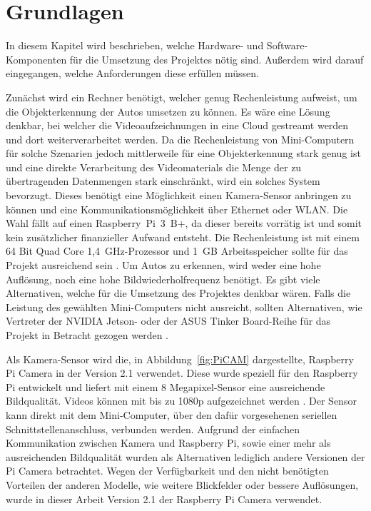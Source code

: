 \section{Grundlagen}\label{ch:Grundlagen}
In diesem Kapitel wird beschrieben, welche Hardware- und Software-Komponenten für die Umsetzung des Projektes nötig sind.
Außerdem wird darauf eingegangen, welche Anforderungen diese erfüllen müssen.

Zunächst wird ein Rechner benötigt, welcher genug Rechenleistung aufweist, um die Objekt\-erkennung der Autos umsetzen zu können.
Es wäre eine Lösung denkbar, bei welcher die Videoaufzeichnungen in eine Cloud gestreamt werden und dort weiterverarbeitet werden.
Da die Rechenleistung von Mini-Computern für solche Szenarien jedoch mittlerweile für eine Objekterkennung stark genug ist und eine direkte Verarbeitung des Videomaterials die Menge der zu übertragenden Datenmengen stark einschränkt, wird ein solches System bevorzugt.
Dieses benötigt eine Möglichkeit einen Kamera-Sensor anbringen zu können und eine Kommunikationsmöglichkeit über Ethernet oder WLAN.
Die Wahl fällt auf einen Raspberry~Pi~3~B+, da dieser bereits vorrätig ist und somit kein zusätzlicher finanzieller Aufwand entsteht.
Die Rechenleistung ist mit einem 64 Bit Quad Core 1,4~GHz-Prozessor und 1~GB Arbeitsspeicher sollte für das Projekt ausreichend sein \cite{pi3}.
Um Autos zu erkennen, wird weder eine hohe Auflösung, noch eine hohe Bildwiederholfrequenz benötigt.
Es gibt viele Alternativen, welche für die Umsetzung des Projektes denkbar wären.
Falls die Leistung des gewählten Mini-Computers nicht ausreicht, sollten Alternativen, wie Vertreter der NVIDIA Jetson- oder der ASUS Tinker Board-Reihe für das Projekt in Betracht gezogen werden \cite{jetson} \cite{tinkerBoard}.

Als Kamera-Sensor wird die, in Abbildung~\ref{fig:PiCAM} dargestellte, Raspberry Pi Camera in der Version 2.1 verwendet.
Diese wurde speziell für den Raspberry Pi entwickelt und liefert mit einem 8 Megapixel-Sensor eine ausreichende Bildqualität.
Videos können mit bis zu 1080p aufgezeichnet werden \cite{piCAM}.
Der Sensor kann direkt mit dem Mini-Computer, über den dafür vorgesehenen seriellen Schnittstellenanschluss, verbunden werden.
Aufgrund der einfachen Kommunikation zwischen Kamera und Raspberry Pi, sowie einer mehr als ausreichenden Bildqualität wurden als Alternativen lediglich andere Versionen der Pi Camera betrachtet.
Wegen der Verfügbarkeit und den nicht benötigten Vorteilen der anderen Modelle, wie weitere Blickfelder oder bessere Auflösungen, wurde in dieser Arbeit Version 2.1 der Raspberry Pi Camera verwendet.

